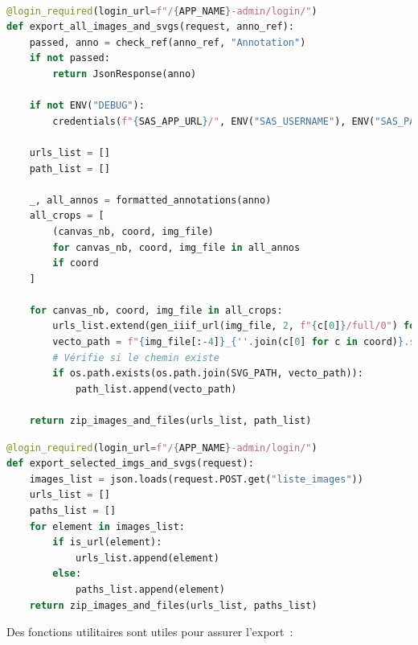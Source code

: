 \begin{lstlisting}[language=python, frame=single, breaklines=true, caption={Vue pour l'export de tous les \svgs et des images associées.}]

@login_required(login_url=f"/{APP_NAME}-admin/login/")
def export_all_images_and_svgs(request, anno_ref):
    passed, anno = check_ref(anno_ref, "Annotation")
    if not passed:
        return JsonResponse(anno)

    if not ENV("DEBUG"):
        credentials(f"{SAS_APP_URL}/", ENV("SAS_USERNAME"), ENV("SAS_PASSWORD"))

    urls_list = []
    path_list = []

    _, all_annos = formatted_annotations(anno)
    all_crops = [
        (canvas_nb, coord, img_file)
        for canvas_nb, coord, img_file in all_annos
        if coord
    ]

    for canvas_nb, coord, img_file in all_crops:
        urls_list.extend(gen_iiif_url(img_file, 2, f"{c[0]}/full/0") for c in coord)
        vecto_path = f"{img_file[:-4]}_{''.join(c[0] for c in coord)}.svg"
        # Vérifie si le chemin existe
        if os.path.exists(os.path.join(SVG_PATH, vecto_path)):
            path_list.append(vecto_path)

    return zip_images_and_files(urls_list, path_list)

\end{lstlisting}

\begin{lstlisting}[language=python, frame=single, breaklines=true, caption={Vue pour l'export des \svgs et des images \jpeg sélectionnés.}]
@login_required(login_url=f"/{APP_NAME}-admin/login/")
def export_selected_imgs_and_svgs(request):
    images_list = json.loads(request.POST.get("liste_images"))
    urls_list = []
    paths_list = []
    for element in images_list:
        if is_url(element):
            urls_list.append(element)
        else:
            paths_list.append(element)
    return zip_images_and_files(urls_list, paths_list)
\end{lstlisting}

Des fonctions utilitaires sont utiles pour assurer l'export~: 

